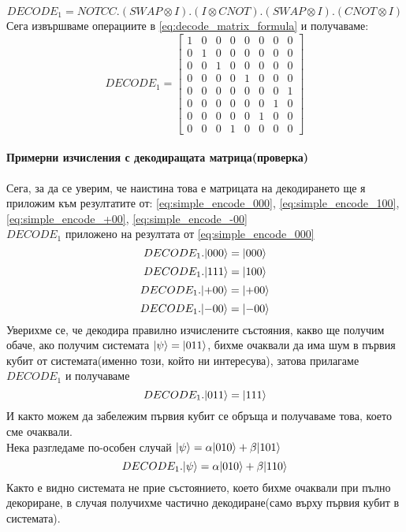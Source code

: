\documentclass[11pt,oneside,a4paper]{article}
\begin{document}
\begin{equation}
    DECODE_1 = NOTCC . (SWAP \otimes I) . (I \otimes CNOT) . (SWAP \otimes I) . (CNOT \otimes I)
    \label{eq:decode_matrix_formula}
\end{equation}
Сега извършваме операциите в \eqref{eq:decode_matrix_formula} и получаваме:
\begin{equation}
    DECODE_1 = \begin{bmatrix}
    1 & 0 & 0 & 0 & 0 & 0 & 0 & 0\\
    0 & 1 & 0 & 0 & 0 & 0 & 0 & 0\\
    0 & 0 & 1 & 0 & 0 & 0 & 0 & 0\\
    0 & 0 & 0 & 0 & 1 & 0 & 0 & 0\\
    0 & 0 & 0 & 0 & 0 & 0 & 0 & 1\\
    0 & 0 & 0 & 0 & 0 & 0 & 1 & 0\\
    0 & 0 & 0 & 0 & 0 & 1 & 0 & 0\\
    0 & 0 & 0 & 1 & 0 & 0 & 0 & 0
    \end{bmatrix}
\end{equation}
\paragraph{Примерни изчисления с декодиращата матрица(проверка)}
Сега, за да се уверим, че наистина това е матрицата на декодирането ще я приложим към резултатите от: \eqref{eq:simple_encode_000}, \eqref{eq:simple_encode_100}, \eqref{eq:simple_encode_+00}, \eqref{eq:simple_encode_-00}\\
$DECODE_1$ приложено на резултата от \eqref{eq:simple_encode_000}
\begin{equation}
    DECODE_1 . {\left\vert{000}\right\rangle} = {\left\vert{000}\right\rangle}
\end{equation}
\begin{equation}
    DECODE_1 . {\left\vert{111}\right\rangle} = {\left\vert{100}\right\rangle}
\end{equation}
\begin{equation}
    DECODE_1 . {\left\vert{+00}\right\rangle} = {\left\vert{+00}\right\rangle}
\end{equation}
\begin{equation}
    DECODE_1 . {\left\vert{-00}\right\rangle} = {\left\vert{-00}\right\rangle}
\end{equation}
Уверихме се, че декодира правилно изчислените състояния, какво ще получим обаче, ако получим системата ${\left\vert{\psi}\right\rangle} = {\left\vert{011}\right\rangle}$, бихме очаквали да има шум в първия кубит от системата(именно този, който ни интересува), затова прилагаме $DECODE_1$ и получаваме
\begin{equation}
    DECODE_1 . {\left\vert{011}\right\rangle} = {\left\vert{111}\right\rangle}
\end{equation}
И както можем да забележим първия кубит се обръща и получаваме това, което сме очаквали.\\
Нека разгледаме по-особен случай ${\left\vert{\psi}\right\rangle} = \alpha{\left\vert{010}\right\rangle} + \beta{\left\vert{101}\right\rangle}$
\begin{equation}
    DECODE_1 . {\left\vert{\psi}\right\rangle} = \alpha{\left\vert{010}\right\rangle} + \beta{\left\vert{110}\right\rangle}
\end{equation}
Както е видно системата не прие състоянието, което бихме очаквали при пълно декориране, в случая получихме частично декодиране(само върху първия кубит в системата).
\end{document}
